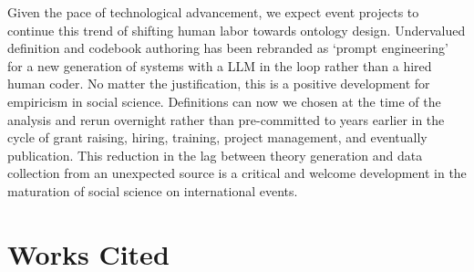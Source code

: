 \documentclass[
]{article}
\begin{document}
Given the pace of technological advancement, we expect event projects to
continue this trend of shifting human labor towards ontology design.
Undervalued definition and codebook authoring has been rebranded as
`prompt engineering' for a new generation of systems with a LLM in the
loop rather than a hired human coder. No matter the justification, this
is a positive development for empiricism in social science. Definitions
can now we chosen at the time of the analysis and rerun overnight rather
than pre-committed to years earlier in the cycle of grant raising,
hiring, training, project management, and eventually publication. This
reduction in the lag between theory generation and data collection from
an unexpected source is a critical and welcome development in the
maturation of social science on international events.

\section*{Works Cited}\label{works-cited}
\end{document}
